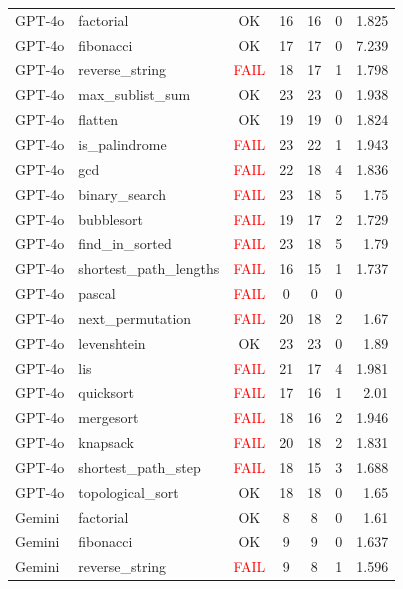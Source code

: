 \begin{longtable}{l l c c c c r}
  GPT-4o & factorial & \textcolor{green!60!black}{OK} & 16 & 16 & 0 & 1.825 \\
  GPT-4o & fibonacci & \textcolor{green!60!black}{OK} & 17 & 17 & 0 & 7.239 \\
  GPT-4o & reverse\_string & \textcolor{red}{FAIL} & 18 & 17 & 1 & 1.798 \\
  GPT-4o & max\_sublist\_sum & \textcolor{green!60!black}{OK} & 23 & 23 & 0 & 1.938 \\
  GPT-4o & flatten & \textcolor{green!60!black}{OK} & 19 & 19 & 0 & 1.824 \\
  GPT-4o & is\_palindrome & \textcolor{red}{FAIL} & 23 & 22 & 1 & 1.943 \\
  GPT-4o & gcd & \textcolor{red}{FAIL} & 22 & 18 & 4 & 1.836 \\
  GPT-4o & binary\_search & \textcolor{red}{FAIL} & 23 & 18 & 5 & 1.75 \\
  GPT-4o & bubblesort & \textcolor{red}{FAIL} & 19 & 17 & 2 & 1.729 \\
  GPT-4o & find\_in\_sorted & \textcolor{red}{FAIL} & 23 & 18 & 5 & 1.79 \\
  GPT-4o & shortest\_path\_lengths & \textcolor{red}{FAIL} & 16 & 15 & 1 & 1.737 \\
  GPT-4o & pascal & \textcolor{red}{FAIL} & 0 & 0 & 0 &  \\
  GPT-4o & next\_permutation & \textcolor{red}{FAIL} & 20 & 18 & 2 & 1.67 \\
  GPT-4o & levenshtein & \textcolor{green!60!black}{OK} & 23 & 23 & 0 & 1.89 \\
  GPT-4o & lis & \textcolor{red}{FAIL} & 21 & 17 & 4 & 1.981 \\
  GPT-4o & quicksort & \textcolor{red}{FAIL} & 17 & 16 & 1 & 2.01 \\
  GPT-4o & mergesort & \textcolor{red}{FAIL} & 18 & 16 & 2 & 1.946 \\
  GPT-4o & knapsack & \textcolor{red}{FAIL} & 20 & 18 & 2 & 1.831 \\
  GPT-4o & shortest\_path\_step & \textcolor{red}{FAIL} & 18 & 15 & 3 & 1.688 \\
  GPT-4o & topological\_sort & \textcolor{green!60!black}{OK} & 18 & 18 & 0 & 1.65 \\
  \midrule
  Gemini & factorial & \textcolor{green!60!black}{OK} & 8 & 8 & 0 & 1.61 \\
  Gemini & fibonacci & \textcolor{green!60!black}{OK} & 9 & 9 & 0 & 1.637 \\
  Gemini & reverse\_string & \textcolor{red}{FAIL} & 9 & 8 & 1 & 1.596 \\

\end{longtable}
